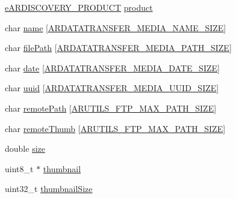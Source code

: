 \begin{DoxyCompactItemize}
\item 
\hyperlink{_a_r_d_i_s_c_o_v_e_r_y___discovery_8h_a908972407587656a48194c58ccd65813}{e\+A\+R\+D\+I\+S\+C\+O\+V\+E\+R\+Y\+\_\+\+P\+R\+O\+D\+U\+CT} \hyperlink{struct_a_r_d_a_t_a_t_r_a_n_s_f_e_r___media__t_aab9e5c46cbe9a57073b48d7500b0f6d3}{product}
\item 
char \hyperlink{struct_a_r_d_a_t_a_t_r_a_n_s_f_e_r___media__t_a134f8cc59e4dce1d81e1a9f542238659}{name} \mbox{[}\hyperlink{_a_r_d_a_t_a_t_r_a_n_s_f_e_r___medias_downloader_8h_ade36aec8d3ded63b850e106cb3dc8276}{A\+R\+D\+A\+T\+A\+T\+R\+A\+N\+S\+F\+E\+R\+\_\+\+M\+E\+D\+I\+A\+\_\+\+N\+A\+M\+E\+\_\+\+S\+I\+ZE}\mbox{]}
\item 
char \hyperlink{struct_a_r_d_a_t_a_t_r_a_n_s_f_e_r___media__t_a152790b30f68d6fc65ba66372acf497c}{file\+Path} \mbox{[}\hyperlink{_a_r_d_a_t_a_t_r_a_n_s_f_e_r___medias_downloader_8h_a7a748c32e1f9345c856d5a6f9ecf7313}{A\+R\+D\+A\+T\+A\+T\+R\+A\+N\+S\+F\+E\+R\+\_\+\+M\+E\+D\+I\+A\+\_\+\+P\+A\+T\+H\+\_\+\+S\+I\+ZE}\mbox{]}
\item 
char \hyperlink{struct_a_r_d_a_t_a_t_r_a_n_s_f_e_r___media__t_a5425386ec2a7af1276fd361d4778d16d}{date} \mbox{[}\hyperlink{_a_r_d_a_t_a_t_r_a_n_s_f_e_r___medias_downloader_8h_ae8933462260ae9d0e7e2717602e246e5}{A\+R\+D\+A\+T\+A\+T\+R\+A\+N\+S\+F\+E\+R\+\_\+\+M\+E\+D\+I\+A\+\_\+\+D\+A\+T\+E\+\_\+\+S\+I\+ZE}\mbox{]}
\item 
char \hyperlink{struct_a_r_d_a_t_a_t_r_a_n_s_f_e_r___media__t_a243226914bc41bb7cd98e05dce8ec1ce}{uuid} \mbox{[}\hyperlink{_a_r_d_a_t_a_t_r_a_n_s_f_e_r___medias_downloader_8h_adb99398df2fc72007ddd78a1a2f9f8ed}{A\+R\+D\+A\+T\+A\+T\+R\+A\+N\+S\+F\+E\+R\+\_\+\+M\+E\+D\+I\+A\+\_\+\+U\+U\+I\+D\+\_\+\+S\+I\+ZE}\mbox{]}
\item 
char \hyperlink{struct_a_r_d_a_t_a_t_r_a_n_s_f_e_r___media__t_a1bcbb7553f7e216220d874586b168eaa}{remote\+Path} \mbox{[}\hyperlink{_a_r_u_t_i_l_s___ftp_8h_a7e05d1c6e63689a6bea17607ed780644}{A\+R\+U\+T\+I\+L\+S\+\_\+\+F\+T\+P\+\_\+\+M\+A\+X\+\_\+\+P\+A\+T\+H\+\_\+\+S\+I\+ZE}\mbox{]}
\item 
char \hyperlink{struct_a_r_d_a_t_a_t_r_a_n_s_f_e_r___media__t_a7d4a6327a1323b10490b43e68609cd53}{remote\+Thumb} \mbox{[}\hyperlink{_a_r_u_t_i_l_s___ftp_8h_a7e05d1c6e63689a6bea17607ed780644}{A\+R\+U\+T\+I\+L\+S\+\_\+\+F\+T\+P\+\_\+\+M\+A\+X\+\_\+\+P\+A\+T\+H\+\_\+\+S\+I\+ZE}\mbox{]}
\item 
double \hyperlink{struct_a_r_d_a_t_a_t_r_a_n_s_f_e_r___media__t_af3d35b5287620197a2f914f57a65dc70}{size}
\item 
uint8\+\_\+t $\ast$ \hyperlink{struct_a_r_d_a_t_a_t_r_a_n_s_f_e_r___media__t_a81df58d6d6f8f4f3ffae0d214eef5ed5}{thumbnail}
\item 
uint32\+\_\+t \hyperlink{struct_a_r_d_a_t_a_t_r_a_n_s_f_e_r___media__t_ab4c46c599c8ef7c8e2493b78e0fdd375}{thumbnail\+Size}
\end{DoxyCompactItemize}


